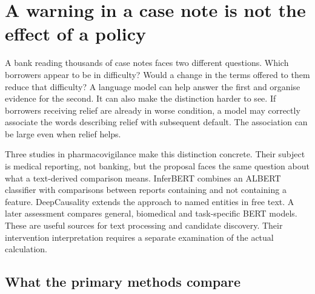 \section{A warning in a case note is not the effect of a policy}
\label{closure30:text-signals}

A bank reading thousands of case notes faces two different questions. Which
borrowers appear to be in difficulty? Would a change in the terms offered to
them reduce that difficulty? A language model can help answer the first and
organise evidence for the second. It can also make the distinction harder to
see. If borrowers receiving relief are already in worse condition, a model
may correctly associate the words describing relief with subsequent default.
The association can be large even when relief helps.

Three studies in pharmacovigilance make this distinction concrete. Their
subject is medical reporting, not banking, but the proposal faces the same
question about what a text-derived comparison means. InferBERT combines an
ALBERT classifier with comparisons between reports containing and not
containing a feature. DeepCausality extends the approach to named entities
in free text. A later assessment compares general, biomedical and
task-specific BERT models. These are useful sources for text processing and
candidate discovery. Their intervention interpretation requires a separate
examination of the actual calculation.
\citep{closure30inferbert,closure30deepcausality,closure30pharma}

\subsection{What the primary methods compare}

